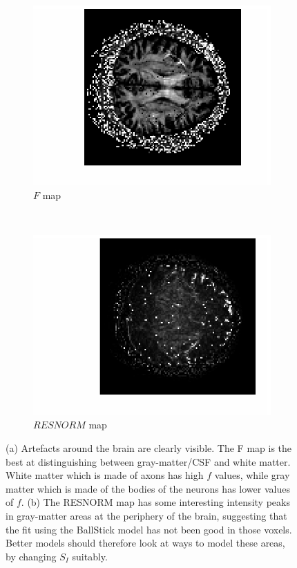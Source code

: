 \documentclass[11pt,a4paper,oneside]{report}
\begin{document}
\begin{figure}[H]
  \centering
  \begin{subfigure}[b]{0.5\textwidth}
      \centering
    \includegraphics[scale=1]{figures/q1/q114-F.eps}
    \caption{$F$ map}
    \label{q114-F}
  \end{subfigure}%
  ~
  \begin{subfigure}[b]{0.5\textwidth}
      \centering
    \includegraphics[scale=1]{figures/q1/q114-RESNORM.eps}
    \caption{$RESNORM$ map}
    \label{q114-RESNORM}
  \end{subfigure}%
  \caption{(a) Artefacts around the brain are clearly visible. The F map is the best at distinguishing between gray-matter/CSF and white matter. White matter which is made of axons has high $f$ values, while gray matter which is made of the bodies of the neurons has lower values of $f$. (b) The RESNORM map has some interesting intensity peaks in gray-matter areas at the periphery of the brain, suggesting that the fit using the BallStick model has not been good in those voxels. Better models should therefore look at ways to model these areas, by changing $S_I$ suitably.}

\end{figure}
\end{document}
